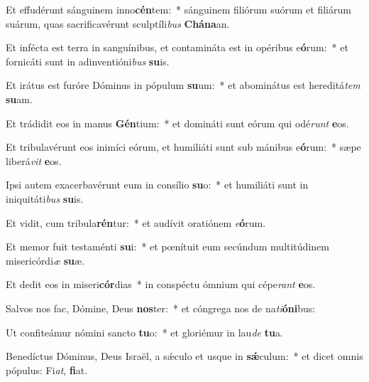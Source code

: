 \item Et effudérunt sánguinem inno\textbf{cén}tem:~* sánguinem filiórum suórum et filiárum suárum, quas sacrificavérunt sculptíli\textit{bus} \textbf{Chá}\textbf{na}an.
\item Et infécta est terra in sanguínibus, et contamináta est in opéribus e\textbf{ó}rum:~* et fornicáti sunt in adinventióni\textit{bus} \textbf{su}is.
\item Et irátus est furóre Dóminus in pópulum \textbf{su}um:~* et abominátus est hereditá\textit{tem} \textbf{su}am.
\item Et trádidit eos in manus \textbf{Gén}tium:~* et domináti sunt eórum qui odé\textit{runt} \textbf{e}os.
\item Et tribulavérunt eos inimíci eórum, et humiliáti sunt sub mánibus e\textbf{ó}rum:~* sæpe liberá\textit{vit} \textbf{e}os.
\item Ipsi autem exacerbavérunt eum in consílio \textbf{su}o:~* et humiliáti sunt in iniquitáti\textit{bus} \textbf{su}is.
\item Et vidit, cum tribula\textbf{rén}tur:~* et audívit oratiónem \textit{e}\textbf{ó}rum.
\item Et memor fuit testaménti \textbf{su}i:~* et pœnítuit eum secúndum multitúdinem misericórdi\textit{æ} \textbf{su}æ.
\item Et dedit eos in miseri\textbf{cór}dias~* in conspéctu ómnium qui cépe\textit{rant} \textbf{e}os.
\item Salvos nos fac, Dómine, Deus \textbf{nos}ter:~* et cóngrega nos de na\textit{ti}\textbf{ó}\textbf{ni}bus:
\item Ut confiteámur nómini sancto \textbf{tu}o:~* et gloriémur in lau\textit{de} \textbf{tu}a.
\item Benedíctus Dóminus, Deus Israël, a sǽculo et usque in \textbf{sǽ}culum:~* et dicet omnis pópulus: Fi\textit{at}, \textbf{fi}at.
